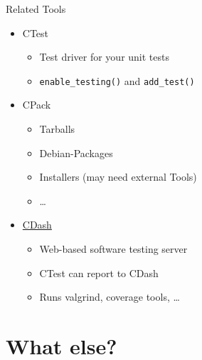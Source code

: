 \documentclass[t]{beamer}
\begin{document}
\begin{frame}{Related Tools}
    \begin{itemize}
        \item CTest
            \begin{itemize}
                \item Test driver for your unit tests
                \item \texttt{enable\_testing()} and \texttt{add\_test()}
            \end{itemize}
        \item CPack
            \begin{itemize}
                \item Tarballs
                \item Debian-Packages
                \item Installers (may need external Tools)
                \item …
            \end{itemize}
        \item \href{https://www.cdash.org/}{CDash}
            \begin{itemize}
                \item Web-based software testing server
                \item CTest can report to CDash
                \item Runs valgrind, coverage tools, …
            \end{itemize}
    \end{itemize}
\end{frame}

\section*{What else?}

\end{document}
